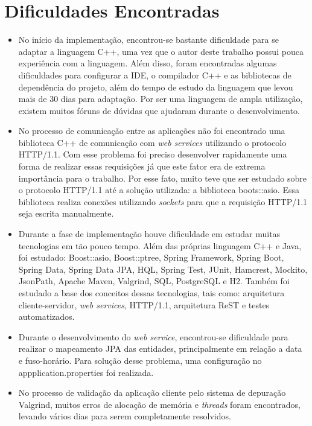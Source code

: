 \section{Dificuldades Encontradas}
    \begin{itemize}
        \item No início da implementação, encontrou-se bastante dificuldade para se adaptar a linguagem C++, uma vez que o autor deste trabalho possui pouca experiência com a linguagem. Além disso, foram encontradas algumas dificuldades para configurar a IDE, o compilador C++ e as bibliotecas de dependência do projeto, além do tempo de estudo da linguagem que levou mais de 30 dias para adaptação. Por ser uma linguagem de ampla utilização, existem muitos fóruns de dúvidas que ajudaram durante o desenvolvimento.
        
        \item No processo de comunicação entre as aplicações não foi encontrado uma biblioteca C++ de comunicação com \textit{web services} utilizando o protocolo HTTP/1.1. Com esse problema foi preciso desenvolver rapidamente uma forma de realizar essas requisições já que este fator era de extrema importância para o trabalho. Por esse fato, muito teve que ser estudado sobre o protocolo HTTP/1.1 até a solução utilizada: a biblioteca boots::asio. Essa biblioteca realiza conexões utilizando \textit{sockets} para que a requisição HTTP/1.1 seja escrita manualmente.
        
        \item Durante a fase de implementação houve dificuldade em estudar muitas tecnologias em tão pouco tempo. Além das próprias linguagem C++ e Java, foi estudado: Boost::asio, Boost::ptree, Spring Framework, Spring Boot, Spring Data, Spring Data JPA, HQL, Spring Test, JUnit, Hamcrest, Mockito, JsonPath, Apache Maven, Valgrind, SQL, PostgreSQL e H2. Também foi estudado a base dos conceitos dessas tecnologias, tais como: arquitetura cliente-servidor, \textit{web services}, HTTP/1.1, arquitetura ReST e testes automatizados.
        
        \item Durante o desenvolvimento do \textit{web service}, encontrou-se dificuldade para realizar o mapeamento JPA das entidades, principalmente em relação a data e fuso-horário. Para solução desse problema, uma configuração no appplication.properties foi realizada.
 
        \item No processo de validação da aplicação cliente pelo sistema de depuração Valgrind, muitos erros de alocação de memória e \textit{threads} foram encontrados, levando vários dias para serem completamente resolvidos.
    \end{itemize}

